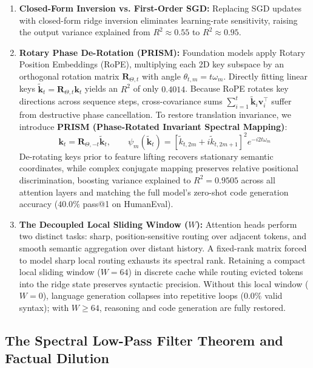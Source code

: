 \documentclass[11pt,a4paper]{article}
\begin{document}
\begin{enumerate}[leftmargin=*]
    \item \textbf{Closed-Form Inversion vs. First-Order SGD:} Replacing SGD updates with closed-form ridge inversion eliminates learning-rate sensitivity, raising the output variance explained from $R^2 \approx 0.55$ to $R^2 \approx 0.95$.
    \item \textbf{Rotary Phase De-Rotation (PRISM):} Foundation models apply Rotary Position Embeddings (RoPE), multiplying each 2D key subspace by an orthogonal rotation matrix $\mathbf{R}_{\Theta, t}$ with angle $\theta_{t,m} = t \omega_m$. Directly fitting linear keys $\tilde{\mathbf{k}}_t = \mathbf{R}_{\Theta, t}\mathbf{k}_t$ yields an $R^2$ of only $0.4014$. Because RoPE rotates key directions across sequence steps, cross-covariance sums $\sum_{i=1}^t \tilde{\mathbf{k}}_i \mathbf{v}_i^\top$ suffer from destructive phase cancellation. To restore translation invariance, we introduce \textbf{PRISM (Phase-Rotated Invariant Spectral Mapping)}:
    \begin{equation}
    \mathbf{k}_t = \mathbf{R}_{\Theta, -t} \tilde{\mathbf{k}}_t, \qquad \psi_m(\tilde{\mathbf{k}}_t) = \left[\tilde{k}_{t,2m} + i \tilde{k}_{t,2m+1}\right]^2 e^{-i 2 t \omega_m}
    \end{equation}
    De-rotating keys prior to feature lifting recovers stationary semantic coordinates, while complex conjugate mapping preserves relative positional discrimination, boosting variance explained to $R^2 = 0.9505$ across all attention layers and matching the full model's zero-shot code generation accuracy ($40.0\%$ pass@1 on HumanEval).
    \item \textbf{The Decoupled Local Sliding Window ($W$):} Attention heads perform two distinct tasks: sharp, position-sensitive routing over adjacent tokens, and smooth semantic aggregation over distant history. A fixed-rank matrix forced to model sharp local routing exhausts its spectral rank. Retaining a compact local sliding window ($W = 64$) in discrete cache while routing evicted tokens into the ridge state preserves syntactic precision. Without this local window ($W=0$), language generation collapses into repetitive loops ($0.0\%$ valid syntax); with $W \ge 64$, reasoning and code generation are fully restored.
\end{enumerate}

\subsection{The Spectral Low-Pass Filter Theorem and Factual Dilution}
\label{sec:spectral_theorem}
\end{document}
